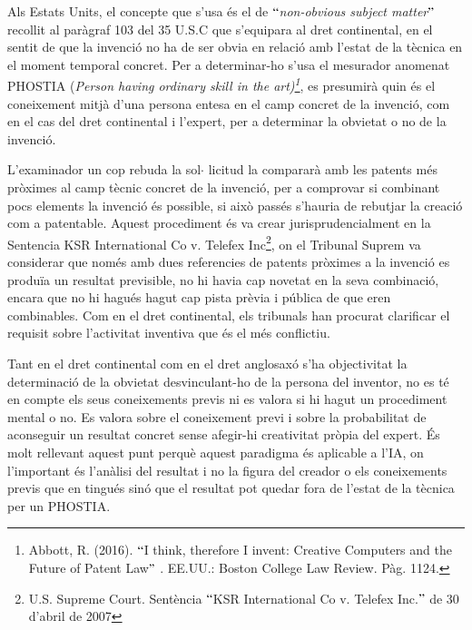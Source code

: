 \documentclass[12pt]{article}
\begin{document}
\vspace{\baselineskip}
Als Estats Units, el concepte que s’usa és el de $``$\textit{non-obvious subject matter$"$  }recollit al paràgraf 103 del 35 U.S.C que s’equipara al dret continental, en el sentit de que la invenció no ha de ser obvia en relació amb l’estat de la tècnica en el moment temporal concret. Per a determinar-ho s’usa el mesurador anomenat PHOSTIA (\textit{Person having ordinary skill in the art)\footnote{ Abbott, R. (2016). $``$I think, therefore I invent: Creative Computers and the Future of Patent Law$"$ . EE.UU.: Boston College Law Review. Pàg. 1124. }}, es presumirà quin és el coneixement mitjà d’una persona entesa en el camp concret de la invenció, com en el cas del dret continental i l’expert, per a determinar la obvietat o no de la invenció. \par


\vspace{\baselineskip}
L’examinador un cop rebuda la sol$ \cdot $ licitud la compararà amb les patents més pròximes al camp tècnic concret de la invenció, per a comprovar si combinant pocs elements la invenció és possible, si això passés s’hauria de rebutjar la creació com a patentable. Aquest procediment és va crear jurisprudencialment en la Sentencia KSR International Co v. Telefex Inc\footnote{ U.S. Supreme Court. Sentència $``$KSR International Co v. Telefex Inc.$"$  de 30 d’abril de 2007 }, on el Tribunal Suprem va considerar que només amb dues referencies  de patents pròximes a la invenció es produïa un resultat previsible, no hi havia cap novetat en la seva combinació, encara que no hi hagués hagut cap pista prèvia i pública de que eren combinables. Com en el dret continental, els tribunals han procurat clarificar el requisit sobre l’activitat inventiva que és el més conflictiu. \par


\vspace{\baselineskip}
Tant en el dret continental com en el dret anglosaxó s’ha objectivitat la determinació de la obvietat desvinculant-ho de la persona del inventor, no es té en compte els seus coneixements previs ni es valora si hi hagut un procediment mental o no. Es valora sobre el coneixement previ i sobre la probabilitat de aconseguir un resultat concret sense afegir-hi creativitat pròpia del expert. És molt rellevant aquest punt perquè aquest paradigma és aplicable a l’IA, on l’important és l’anàlisi del resultat i no la figura del creador o els coneixements previs que en tingués sinó que el resultat pot quedar fora de l’estat de la tècnica per un PHOSTIA.\par
\end{document}
